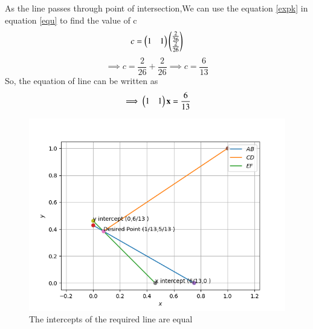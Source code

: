 \documentclass[journal,12pt,twocolumn]{IEEEtran}
\begin{document}
\begin{flushleft}
\begin{equation}
    \end{equation}
    As the line passes through point of intersection,We can use the equation \eqref{expk} in equation \eqref{equ} to find the value of c\\
    \begin{equation}
    c=
    \begin{pmatrix}1 & 1\end{pmatrix}
    \begin{pmatrix}\frac{2}{26} \\  
    	\frac{2}{26} \end{pmatrix}
    \end{equation}
    \begin{equation}
    \implies c=\frac{2}{26}+\frac{2}{26}
    \implies c=\frac{6}{13}
    \end{equation}
    So, the equation of line can be written as
    \begin{equation}
    \implies
    \begin{pmatrix}1 & 1\end{pmatrix}
    	{\mathbf{x}} = \frac{6}{13}
    \end{equation}
    \begin{figure}[!ht]
    \centering
    \includegraphics[width=\columnwidth]{Assignment_1}
     \caption{The intercepts of the required line are equal}
    \end{figure}
    \end{flushleft}
    
\end{document}
